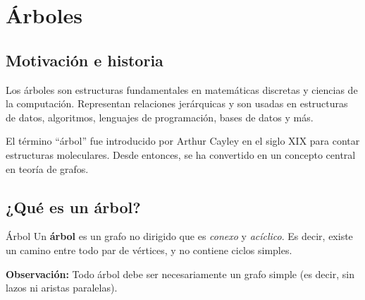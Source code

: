 
\section{Árboles}

\subsection{Motivación e historia}

Los árboles son estructuras fundamentales en matemáticas discretas y ciencias de la computación. Representan relaciones jerárquicas y son usadas en estructuras de datos, algoritmos, lenguajes de programación, bases de datos y más.

El término “árbol” fue introducido por Arthur Cayley en el siglo XIX para contar estructuras moleculares. Desde entonces, se ha convertido en un concepto central en teoría de grafos.

\subsection{¿Qué es un árbol?}

\begin{definitionblock}{Árbol}
Un \textbf{árbol} es un grafo no dirigido que es \emph{conexo} y \emph{acíclico}. Es decir, existe un camino entre todo par de vértices, y no contiene ciclos simples.
\end{definitionblock}

\noindent \textbf{Observación:} Todo árbol debe ser necesariamente un grafo simple (es decir, sin lazos ni aristas paralelas).


\begin{center}
\end{center}

